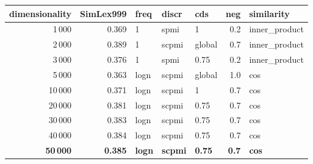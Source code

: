 \begin{tabular}{rrlllrl}
\toprule
 dimensionality &  SimLex999 &  freq &  discr &     cds &  neg &     similarity \\
\midrule
           1\,000 &      0.369 &     1 &   spmi &       1 &  0.2 &  inner\_product \\
           2\,000 &      0.389 &     1 &  scpmi &  global &  0.7 &  inner\_product \\
           3\,000 &      0.376 &     1 &   spmi &    0.75 &  0.2 &  inner\_product \\
           5\,000 &      0.363 &  logn &  scpmi &  global &  1.0 &            cos \\
          10\,000 &      0.371 &  logn &  scpmi &       1 &  0.7 &            cos \\
          20\,000 &      0.381 &  logn &  scpmi &    0.75 &  0.7 &            cos \\
          30\,000 &      0.383 &  logn &  scpmi &    0.75 &  0.7 &            cos \\
          40\,000 &      0.384 &  logn &  scpmi &    0.75 &  0.7 &            cos \\
          \textbf{50\,000} &      \textbf{0.385} &  \textbf{logn} &  \textbf{scpmi} &    \textbf{0.75} &  \textbf{0.7} &            \textbf{cos} \\
\bottomrule
\end{tabular}
